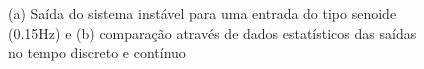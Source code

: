 \begin{figure}[H]
\begin{center}
\end{center}
\caption{(a) Saída do sistema instável para uma entrada do tipo senoide (0.15Hz) e (b) comparação através de dados estatísticos das saídas no tempo discreto e contínuo}
\label{saida:ins:2} 
\end{figure}

\pagebreak





